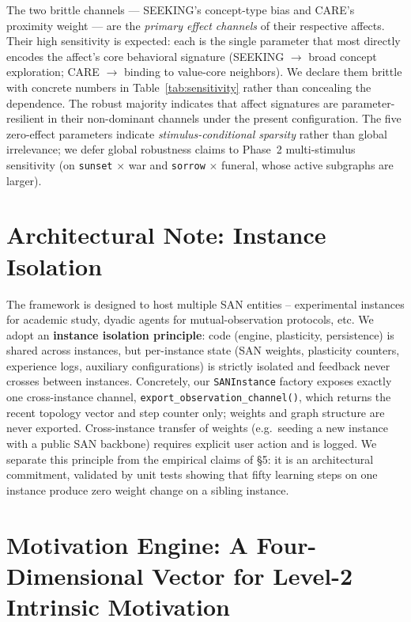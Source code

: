 \documentclass{article}
\begin{document}
The two brittle channels --- SEEKING's concept-type bias and CARE's
proximity weight --- are the \emph{primary effect channels} of their
respective affects. Their high sensitivity is expected: each is the
single parameter that most directly encodes the affect's core
behavioral signature (SEEKING $\to$ broad concept exploration; CARE $\to$
binding to value-core neighbors). We declare them brittle with concrete
numbers in Table~\ref{tab:sensitivity} rather than concealing the
dependence. The robust majority indicates that affect signatures are
parameter-resilient in their non-dominant channels under the present
configuration. The five zero-effect parameters indicate
\emph{stimulus-conditional sparsity} rather than global irrelevance; we
defer global robustness claims to Phase~2 multi-stimulus sensitivity (on
\texttt{sunset} $\times$ war and \texttt{sorrow} $\times$ funeral, whose
active subgraphs are larger).

\section{Architectural Note: Instance Isolation}
The framework is designed to host multiple SAN entities -- experimental
instances for academic study, dyadic agents for mutual-observation
protocols, etc. We adopt an \textbf{instance isolation principle}: code
(engine, plasticity, persistence) is shared across instances, but
per-instance state (SAN weights, plasticity counters, experience logs,
auxiliary configurations) is strictly isolated and feedback never crosses
between instances. Concretely, our \texttt{SANInstance} factory exposes
exactly one cross-instance channel, \texttt{export\_observation\_channel()},
which returns the recent topology vector and step counter only; weights and
graph structure are never exported. Cross-instance transfer of weights
(e.g.\ seeding a new instance with a public SAN backbone) requires explicit
user action and is logged. We separate this principle from the empirical
claims of \S 5: it is an architectural commitment, validated by unit tests
showing that fifty learning steps on one instance produce zero weight
change on a sibling instance.

\section{Motivation Engine: A Four-Dimensional Vector for Level-2 Intrinsic
Motivation}
\label{sec:motivation}
\end{document}
